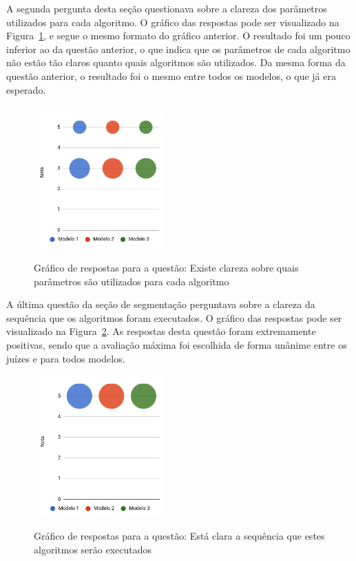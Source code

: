 \documentclass[12pt,oneside,a4paper,english,french,spanish,brazil,]{abntex2}
\begin{document}
A segunda pergunta desta seção questionava sobre a clareza dos parâmetros utilizados para cada algoritmo. O gráfico das respostas pode ser visualizado na Figura~\ref{fig:AJ_Qualidade_9}, e segue o mesmo formato do gráfico anterior. O resultado foi um pouco inferior ao da questão anterior, o que indica que os parâmetros de cada algoritmo não estão tão claros quanto quais algoritmos são utilizados. Da mesma forma da questão anterior, o resultado foi o mesmo entre todos os modelos, o que já era esperado.

\begin{figure}[ht]
\centering
\caption{Gráfico de respostas para a questão: Existe clareza sobre quais parâmetros são utilizados para cada algoritmo}
\includegraphics[width=0.45\textwidth]{imagens/Avaliacao_Juizes/Grafico_9.png}
\sourceAuthor{}
\label{fig:AJ_Qualidade_9}
\end{figure}

A última questão da seção de segmentação perguntava sobre a clareza da sequência que os algoritmos foram executados. O gráfico das respostas pode ser visualizado na Figura~\ref{fig:AJ_Qualidade_10}. As respostas desta questão foram extremamente positivas, sendo que a avaliação máxima foi escolhida de forma unânime entre os juízes e para todos modelos.

\begin{figure}[ht]
\centering
\caption{Gráfico de respostas para a questão: Está clara a sequência que estes algoritmos serão executados}
\includegraphics[width=0.45\textwidth]{imagens/Avaliacao_Juizes/Grafico_11.png}
\sourceAuthor{}
\label{fig:AJ_Qualidade_10}
\end{figure}
\end{document}
